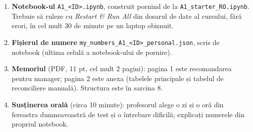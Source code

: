 \section{}
\begin{enumerate}[label=\textbf{D\arabic*}]
\item {}%
  {\textbf{Notebook-ul} \texttt{A1\_<ID>.ipynb}, construit pornind de la \texttt{A1\_starter\_RO.ipynb}. Trebuie să ruleze cu \emph{Restart \& Run All}
  din dosarul de date al cursului, fără erori, în cel mult 30 de minute pe un laptop obișnuit.}
\item {}%
  {\textbf{Fișierul de numere} \texttt{my\_numbers\_A1\_<ID>\_personal.json}, scris de notebook (ultima celulă a notebook-ului de pornire).}
\item {}%
  {\textbf{Memoriul} (PDF, 11 pt, cel mult 2 pagini): pagina 1 este recomandarea pentru manager; pagina 2 este anexa
  (tabelele principale și tabelul de reconciliere manuală). Structura este în sarcina 8.}
\item {}%
  {\textbf{Susținerea orală} (circa 10 minute): profesorul alege o zi și o oră din fereastra dumneavoastră de test și o întrebare dificilă;
  explicați numerele din propriul notebook.}
\end{enumerate}

